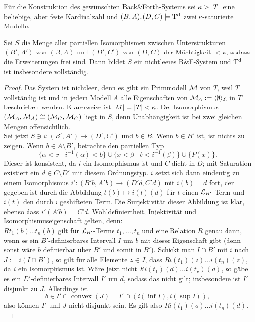 Für die Konstruktion des gewünschten Back\&Forth-Systems sei $\kappa>{\left| T \right|}$ eine beliebige, aber feste Kardinalzahl und $(B,A),(D,C)\models\operatorname{T^d}$ zwei $\kappa$-saturierte Modelle.
\begin{theorem}\label{BackForth}
	Sei $S$ die Menge aller partiellen Isomorphismen zwischen Unterstrukturen $(B',A')$ von $(B,A)$ und $(D',C')$ von $(D,C)$ der Mächtigkeit $<\kappa$, sodass die Erweiterungen frei sind. Dann bildet $S$ ein nichtleeres B\&F-System und $\operatorname{T^d}$ ist insbesondere vollständig.
\end{theorem}
\begin{proof}
	Das System ist nichtleer, denn es gibt ein Primmodell $\mathcal{M}$ von $T$, weil $T$ vollständig ist und in jedem Modell $A$ alle Eigenschaften von $\mathcal{M}_A:=\langle\emptyset\rangle_{\mathcal{L}}$ in $T$ beschrieben werden. Klarerweise ist ${\left| M \right|}={\left| T \right|}<\kappa$. Der Isomorphismus $(\mathcal{M}_A,\mathcal{M}_A)\cong(\mathcal{M}_C,\mathcal{M}_C)$ liegt in $S$, denn Unabhängigkeit ist bei zwei gleichen Mengen offensichtlich.\\
	Sei jetzt $S\ni i:(B',A')\rightarrow(D',C')$ und $b\in B$. Wenn $b\in B'$ ist, ist nichts zu zeigen. Wenn $b\in A\setminus B'$, betrachte den partiellen Typ $$\{\alpha<x\mid i^{-1}(\alpha)<b\}\cup\{x<\beta\mid b<i^{-1}(\beta)\}\cup\{P(x)\}.$$
	Dieser ist konsistent, da $i$ ein Isomorphismus ist und $C$ dicht in $D$; mit Saturation existiert ein $d\in C\setminus D'$ mit diesem Ordnungstyp. $i$ setzt sich dann eindeutig zu einem Isomorphismus $i':(B'b,A'b)\rightarrow(D'd,C'd)$ mit $i(b)=d$ fort, der gegeben ist durch die Abbildung $t(b)\mapsto i(t)(d)$ für $t$ einen $\mathcal{L}_{B'}$-Term und $i(t)$ den durch $i$ geshifteten Term. Die Surjektivität dieser Abbildung ist klar, ebenso dass $i'(A'b)=C'd$. Wohldefiniertheit, Injektivität und Isomorphismuseigenschaft gelten, denn:\\
	$Rt_1(b)\dots t_n(b)$ gilt für $\mathcal{L}_{B'}$-Terme $t_1,\dots,t_n$ und eine Relation $R$ genau dann, wenn es ein $B'$-definierbares Intervall $I$ um $b$ mit dieser Eigenschaft gibt (denn sonst wäre $b$ definierbar über $B'$ und somit in $B'$). Schickt man $I\cap B'$ mit $i$ nach $J:=i(I\cap B')$, so gilt für alle Elemente $z\in J$, dass $Ri(t_1)(z)\dots i(t_n)(z)$, da $i$ ein Isomorphismus ist. Wäre jetzt nicht $Ri(t_1)(d)\dots i(t_n)(d)$, so gäbe es ein $D'$-definierbares Intervall $I'$ um $d$, sodass das nicht gilt; insbesondere ist $I'$ disjunkt zu $J$. Allerdings ist $$b\in I'\cap\operatorname{convex}(J)=I'\cap(i(\inf I),i(\sup I)),$$ also können $I'$ und $J$ nicht disjunkt sein. Es gilt also $Ri(t_1)(d)\dots i(t_n)(d)$.\\

\end{proof}
